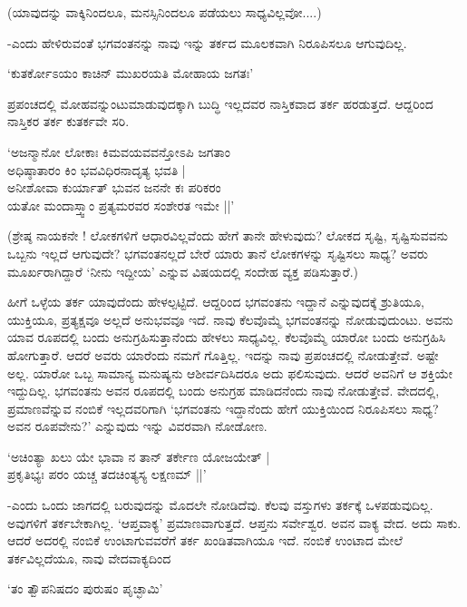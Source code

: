 (ಯಾವುದನ್ನು ವಾಕ್ಕಿನಿಂದಲೂ, ಮನಸ್ಸಿನಿಂದಲೂ ಪಡೆಯಲು ಸಾಧ್ಯವಿಲ್ಲವೋ....)

-ಎಂದು ಹೇಳಿರುವಂತೆ ಭಗವಂತನನ್ನು ನಾವು ಇನ್ನು ತರ್ಕದ ಮೂಲಕವಾಗಿ ನಿರೂಪಿಸಲೂ ಆಗುವುದಿಲ್ಲ.

\begin{shloka}
`ಕುತರ್ಕೋಽಯಂ ಕಾಚಿನ್ ಮುಖರಯತಿ ಮೋಹಾಯ ಜಗತಃ'
\end{shloka}

ಪ್ರಪಂಚದಲ್ಲಿ ಮೋಹವನ್ನುಂಟುಮಾಡುವುದಕ್ಕಾಗಿ ಬುದ್ಧಿ ಇಲ್ಲದವರ ನಾಸ್ತಿಕವಾದ ತರ್ಕ ಹರಡುತ್ತದೆ. ಆದ್ದರಿಂದ ನಾಸ್ತಿಕರ ತರ್ಕ ಕುತರ್ಕವೇ ಸರಿ.

\begin{shloka}
`ಅಜನ್ಮಾನೋ ಲೋಕಾಃ ಕಿಮವಯವವನ್ತೋಽಪಿ ಜಗತಾಂ\\
ಅಧಿಷ್ಠಾತಾರಂ ಕಿಂ ಭವವಿಧಿರನಾದೃತ್ಯ ಭವತಿ |\\
ಅನೀಶೋವಾ ಕುರ್ಯಾತ್ ಭುವನ ಜನನೇ ಕಃ ಪರಿಕರಂ\\
ಯತೋ ಮಂದಾಸ್ತ್ವಾಂ ಪ್ರತ್ಯಮರವರ ಸಂಶೇರತ ಇಮೇ ||'
\end{shloka}

(ಶ್ರೇಷ್ಠ ನಾಯಕನೇ ! ಲೋಕಗಳಿಗೆ ಆಧಾರವಿಲ್ಲವೆಂದು ಹೇಗೆ ತಾನೇ ಹೇಳುವುದು? ಲೋಕದ ಸೃಷ್ಟಿ, ಸೃಷ್ಟಿಸುವವನು ಒಬ್ಬನು ಇಲ್ಲದೆ ಆಗುವುದೇ? ಭಗವಂತನಲ್ಲದೆ ಬೇರೆ ಯಾರು ತಾನೆ ಲೋಕಗಳನ್ನು ಸೃಷ್ಟಿಸಲು ಸಾಧ್ಯ? ಅವರು ಮೂರ್ಖರಾಗಿದ್ದಾರೆ `ನೀನು ಇದ್ದೀಯ' ಎನ್ನುವ ವಿಷಯದಲ್ಲಿ ಸಂದೇಹ ವ್ಯಕ್ತ ಪಡಿಸುತ್ತಾರೆ.)

ಹೀಗೆ ಒಳ್ಳೆಯ ತರ್ಕ ಯಾವುದೆಂದು ಹೇಳಲ್ಪಟ್ಟಿದೆ. ಆದ್ದರಿಂದ ಭಗವಂತನು ಇದ್ದಾನೆ ಎನ್ನುವುದಕ್ಕೆ ಶ್ರುತಿಯೂ, ಯುಕ್ತಿಯೂ, ಪ್ರತ್ಯಕ್ಷವೂ ಅಲ್ಲದೆ ಅನುಭವವೂ ಇದೆ. ನಾವು ಕೆಲವೊಮ್ಮೆ ಭಗವಂತನನ್ನು ನೋಡುವುದುಂಟು. ಅವನು ಯಾವ ರೂಪದಲ್ಲಿ ಬಂದು ಅನುಗ್ರಹಿಸುತ್ತಾನೆಂದು ಹೇಳಲು ಸಾಧ್ಯವಿಲ್ಲ. ಕೆಲವೊಮ್ಮೆ ಯಾರೋ ಬಂದು ಅನುಗ್ರಹಿಸಿ ಹೋಗುತ್ತಾರೆ. ಆದರೆ ಅವರು ಯಾರೆಂದು ನಮಗೆ ಗೊತ್ತಿಲ್ಲ. ಇದನ್ನು ನಾವು ಪ್ರಪಂಚದಲ್ಲಿ ನೋಡುತ್ತೇವೆ. ಅಷ್ಟೇ ಅಲ್ಲ. ಯಾರೋ ಒಬ್ಬ ಸಾಮಾನ್ಯ ಮನುಷ್ಯನು ಆಶೀರ್ವದಿಸಿದರೂ ಅದು ಫಲಿಸುವುದು. ಆದರೆ ಅವನಿಗೆ ಆ ಶಕ್ತಿಯೇ ಇದ್ದುದಿಲ್ಲ. ಭಗವಂತನು ಅವನ ರೂಪದಲ್ಲಿ ಬಂದು ಅನುಗ್ರಹ ಮಾಡಿದನೆಂದು ನಾವು ನೋಡುತ್ತೇವೆ. ವೇದದಲ್ಲಿ, ಪ್ರಮಾಣವೆನ್ನುವ ನಂಬಿಕೆ ಇಲ್ಲದವರಿಗಾಗಿ `ಭಗವಂತನು ಇದ್ದಾನೆಂದು ಹೇಗೆ ಯುಕ್ತಿಯಿಂದ ನಿರೂಪಿಸಲು ಸಾಧ್ಯ? ಅವನ ರೂಪವೇನು?' ಎನ್ನುವುದು ಇನ್ನು ವಿವರವಾಗಿ ನೋಡೋಣ.

\begin{shloka}
`ಅಚಿಂತ್ಯಾ ಖಲು ಯೇ ಭಾವಾ ನ ತಾನ್ ತರ್ಕೇಣ ಯೋಜಯೇತ್ |\\
ಪ್ರಕೃತಿಭ್ಯಃ ಪರಂ ಯಚ್ಚ ತದಚಿಂತ್ಯಸ್ಯ ಲಕ್ಷಣಮ್ ||'
\end{shloka}

-ಎಂದು ಒಂದು ಜಾಗದಲ್ಲಿ ಬರುವುದನ್ನು ಮೊದಲೇ ನೋಡಿದೆವು. ಕೆಲವು ವಸ್ತುಗಳು ತರ್ಕಕ್ಕೆ ಒಳಪಡುವುದಿಲ್ಲ. ಅವುಗಳಿಗೆ ತರ್ಕಬೇಕಾಗಿಲ್ಲ. `ಆಪ್ತವಾಕ್ಯ' ಪ್ರಮಾಣವಾಗುತ್ತದೆ. ಆಪ್ತನು ಸರ್ವೇಶ್ವರ. ಅವನ ವಾಕ್ಯ ವೇದ. ಅದು ಸಾಕು. ಆದರೆ ಅದರಲ್ಲಿ ನಂಬಿಕೆ ಉಂಟಾಗುವವರೆಗೆ ತರ್ಕ ಖಂಡಿತವಾಗಿಯೂ ಇದೆ. ನಂಬಿಕೆ ಉಂಟಾದ ಮೇಲೆ ತರ್ಕವಿಲ್ಲದೆಯೂ, ನಾವು ವೇದವಾಕ್ಯದಿಂದ

\begin{shloka}
`ತಂ ತ್ವೌಪನಿಷದಂ ಪುರುಷಂ ಪೃಚ್ಛಾಮಿ'
\end{shloka}

